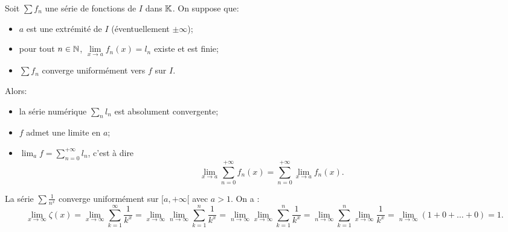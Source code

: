 \documentclass{book}
\newcommand{\Sfn}{\sum f_n}
\begin{document}
\begin{Theoreme}
Soit $\Sfn$ une série de fonctions de $I$ dans $\mathbb{K}  $.
On suppose que:
\begin{itemize}
\item
  $a$ est une extrémité de $I$ (éventuellement $±\infty $);
\item
  pour tout $n\in \mathbb{N}   $, $\lim\limits_{x\to a} f_n(x) = l_n$ existe et est finie;
\item
  $\Sfn$ converge uniformément vers $f$ sur $I$.
\end{itemize}
Alors:
\begin{itemize}
\item
  la série numérique $\sum _n l_n$ est absolument convergente;
\item
  $f$ admet une limite en $a$;
\item
  $\lim_a f = \sum _{n=0}^{+\infty } l_n$, c'est à dire
  \[  \lim_{x \to a} \sum _{n=0}^{+\infty } f_n(x) = \sum _{n=0}^{+\infty } \lim_{x \to a} f_n(x).  \]
\end{itemize}
\end{Theoreme}

\begin{Exemple} La série $\sum\frac {1}{n^{x}}$ converge uniformément sur $[a,+\infty[$ avec $a>1$. On a :
$$\lim_{x\to \infty }\zeta(x)=\lim_{x\to \infty } \sum _{k=1}^{\infty} \frac {1}{k^{x}} = \lim_{x\to \infty }\lim_{n\to \infty } \sum _{k=1}^{n } \frac {1}{k^{x}}= \lim_{n\to \infty } \lim_{x\to \infty } \sum _{k=1}^{n } \frac {1}{k^{x}}  = \lim_{n\to \infty }  \sum _{k=1}^{n }\lim_{x\to \infty } \frac {1}{k^{x}}  =\lim_{n\to \infty } (1+0+\dots +0) =1.
$$
\end{Exemple}
\end{document}
